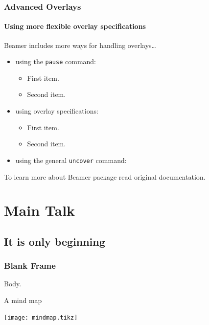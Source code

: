\documentclass{beamer}
\begin{document}
\begin{frame}
  \frametitle{Advanced Overlays}
  \framesubtitle{Using more flexible overlay specifications}

  Beamer includes more ways for handling 
  overlays\dots
  \begin{itemize}
  \item using the \texttt{pause} command:
    \begin{itemize}
    \item
      First item.
      \pause
    \item    
      Second item.
    \end{itemize}
  \item
    using overlay specifications:
    \begin{itemize}
    \item<3->
      First item.
    \item<4->
      Second item.
    \end{itemize}
  \item
    using the general \texttt{uncover} command:
    \begin{itemize}
    \end{itemize}
  \end{itemize}

  To learn more about Beamer package 
  read original documentation.

\end{frame}

\section{Main Talk}

\subsection{It is only beginning}

\begin{frame}
  \frametitle{Blank Frame}
  Body.
\end{frame}

\begin{frame}{A mind map}

\texttt{[image: mindmap.tikz]}


\end{frame}
\end{document}
